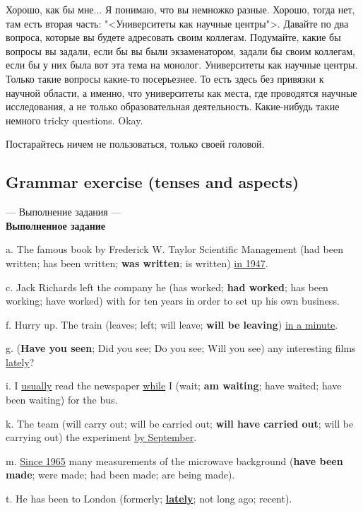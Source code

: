 \documentclass[main.tex]{subfiles}
\begin{document}
Хорошо, как бы мне...
Я понимаю, что вы немножко разные.
Хорошо, тогда нет, там есть вторая часть: "<Университеты как научные центры">.
Давайте по два вопроса, которые вы будете адресовать своим коллегам.
Подумайте, какие бы вопросы вы задали, если бы вы были экзаменатором, задали бы своим коллегам, если бы у них была вот эта тема на монолог.
Университеты как научные центры.
Только такие вопросы какие-то посерьезнее.
То есть здесь без привязки к научной области, а именно, что университеты как места, где проводятся научные исследования, а не только образовательная деятельность.
Какие-нибудь такие немного tricky questions.
Okay.

Постарайтесь ничем не пользоваться, только своей головой.

\subsection{Grammar exercise (tenses and aspects)}

--- Выполнение задания ---
\\

\textbf{Выполненное задание}

a. The famous book by Frederick W. Taylor Scientific Management (had been written; has been written; \textbf{was written}; is written) \underline{in 1947}.

c. Jack Richards left the company he (has worked; \textbf{had worked}; has been working; have worked) with for ten years in order to set up his own business.

f. Hurry up. The train (leaves; left; will leave; \textbf{will be leaving}) \underline{in a minute}.

g. (\textbf{Have you seen}; Did you see; Do you see; Will you see) any interesting films \underline{lately}?

i. I \underline{usually} read the newspaper \underline{while} I (wait; \textbf{am waiting}; have waited; have been waiting) for the bus.

k. The team (will carry out; will be carried out; \textbf{will have carried out}; will be carrying out) the experiment \underline{by September}.

m. \underline{Since 1965} many measurements of the microwave background (\textbf{have been made}; were made; had been made; are being made).

t. He has been to London (formerly; \underline{\textbf{lately}}; not long ago; recent).
\\
 
\end{document}
